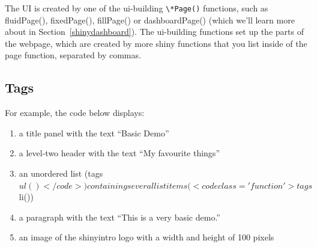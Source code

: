 \documentclass[
]{book}
\newenvironment{Shaded}{\begin{snugshade}}{\end{snugshade}}
\newcommand{\AttributeTok}[1]{\textcolor[rgb]{0.77,0.63,0.00}{#1}}
\newcommand{\FunctionTok}[1]{\textcolor[rgb]{0.00,0.00,0.00}{#1}}
\newcommand{\NormalTok}[1]{#1}
\newcommand{\OtherTok}[1]{\textcolor[rgb]{0.56,0.35,0.01}{#1}}
\newcommand{\SpecialCharTok}[1]{\textcolor[rgb]{0.00,0.00,0.00}{#1}}
\newcommand{\StringTok}[1]{\textcolor[rgb]{0.31,0.60,0.02}{#1}}
\providecommand{\tightlist}{%
  \setlength{\itemsep}{0pt}\setlength{\parskip}{0pt}}
\begin{document}
The UI is created by one of the ui-building \texttt{\textbackslash{}*Page()} functions, such as fluidPage(), fixedPage(), fillPage() or dashboardPage() (which we'll learn more about in Section~\ref{shinydashboard}). The ui-building functions set up the parts of the webpage, which are created by more shiny functions that you list inside of the page function, separated by commas.

\hypertarget{tags}{%
\subsection{Tags}\label{tags}}

For example, the code below displays:

\begin{enumerate}
\def\labelenumi{\arabic{enumi}.}
\tightlist
\item
  a title panel with the text ``Basic Demo''
\item
  a level-two header with the text ``My favourite things''
\item
  an unordered list (tags\(ul()</code>) containing several list items (<code class='function'>tags\)li())
\item
  a paragraph with the text ``This is a very basic demo.''
\item
  an image of the shinyintro logo with a width and height of 100 pixels
\end{enumerate}

\begin{Shaded}
\end{Shaded}
\end{document}
